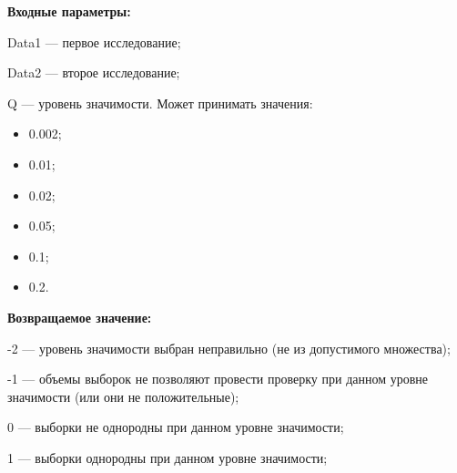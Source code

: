 \textbf{Входные параметры:}

 
Data1 --- первое исследование;
 
    Data2 --- второе исследование;
 
    Q --- уровень значимости. Может принимать значения:
 
    \begin{itemize}
\item 0.002; 
\item 0.01; 
\item 0.02; 
\item 0.05; 
\item 0.1; 
\item 0.2.
\end{itemize}

\textbf{Возвращаемое значение:}

 
 -2 --- уровень значимости выбран неправильно (не из допустимого множества);
 
    -1 --- объемы выборок не позволяют провести проверку при данном уровне значимости (или они не положительные);
 
    0 --- выборки не однородны  при данном уровне значимости;
 
    1 --- выборки однородны  при данном уровне значимости;